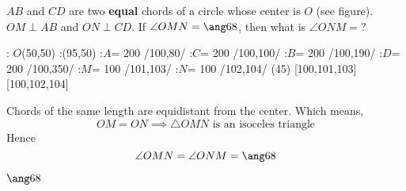 

\question[1] $AB$ and $CD$ are two \textbf{equal} chords of a circle whose center is $O$ (see figure).
$OM\perp AB$ and $ON\perp CD$. If $\angle OMN = \ang\va$, then what is $\angle ONM = ?$

\watchout

  : $O$(50,50)
  :(95,50) %
  :$A$= 200 /100,80/
  :$C$= 200 /100,100/
  :$B$= 200 /100,190/
  :$D$= 200 /100,350/
  :$M$= 100 /101,103/
  :$N$= 100 /102,104/
\figdrawbegin{}
  (45)
  \figdrawline [101,103] 
  \figdrawline [102,104] 
   [100,101,103]
   [100,102,104]
  \figdrawline [300,301]
\figdrawend
{}

\vspace{1cm}
\centerline{\box\figBoxA}


\begin{solution}[\mcq]
  Chords of the same length are equidistant from the center. Which means, 
   \[ OM = ON \implies \bigtriangleup OMN \text{ is an isoceles triangle} \] 
  Hence
    \[ \angle OMN = \angle ONM = \ang\va \]
\end{solution}

\ifprintanswers\begin{codex}$\ang\va$\end{codex}\fi
